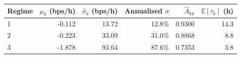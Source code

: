 \begin{tabular}{lrrrrr}
\toprule
Regime & $\hat\mu_k$ (bps/h) & $\hat\sigma_k$ (bps/h) & Annualised $\sigma$ & $\hat A_{kk}$ & $\mathbb{E}[\tau_k]$ (h) \\
\midrule
1 & -0.112 & 13.72 & 12.8\% & 0.9300 & 14.3 \\
2 & -0.223 & 33.09 & 31.0\% & 0.8868 & 8.8 \\
3 & -1.878 & 93.64 & 87.6\% & 0.7353 & 3.8 \\
\bottomrule
\end{tabular}
